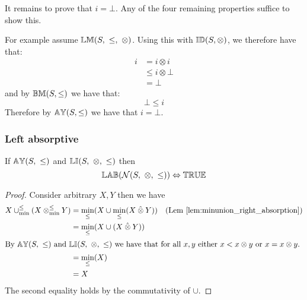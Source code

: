 \documentclass[../Summary.tex]{subfiles}
\begin{document}
It remains to prove that $i = \bot$. Any of the four remaining properties suffice to show this. 

\vspace{0.5em}

For example assume $\propname{LM}(S,\ \leq,\ \otimes)$. Using this with ${\mathbb{ID}}(S,\otimes)$, we therefore have that:
\begin{align*}
i 	& = i \otimes i \\
  	& \leq i \otimes \bot \\
  	& = \bot
\end{align*} 
and by ${\mathbb{BM}}(S,\leq)$ we have that:
\begin{equation*}
\bot \leq i
\end{equation*}
Therefore by ${\mathbb{AY}}(S,\leq)$ we have that $i = \bot$.



\subsubsection{Left absorptive}

\begin{theorem} \label{thm:N_lab}
If ${\mathbb{AY}}(S,\ \leq)$ and ${\mathbb{LI}}(S,\ \otimes,\ \leq)$ then
\begin{equation*}
\propname{LAB}(\mathcal{N}(S,\ \otimes,\ \leq)) \Leftrightarrow \propname{TRUE}
\end{equation*}
\end{theorem}

\begin{proof}

\vspace{0.5em}
Consider arbitrary $X, Y$ then we have
\begin{align*}
X \minunion (X \minlift Y) 	& = \min_\leq(X \cup \min_\leq(X \lift Y)) & \text{(Lem \ref{lem:minunion_right_absorption})} \\
							& = \min_\leq(X \cup (X \lift Y)) \\
\intertext{By $\propname{AY}(S,\ \leq)$ and $\propname{LI}(S,\ \otimes,\ \leq)$ we have that for all $x, y$ either $x < x \otimes y$ or $x = x \otimes y$.}
							& = \min_\leq(X) \\
							& = X
\end{align*}
The second equality holds by the commutativity of $\cup$.
\end{proof}
\end{document}
